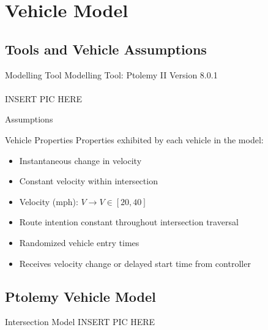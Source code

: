 \documentclass{beamer}
\begin{document}
\section{Vehicle Model}

\subsection{Tools and Vehicle Assumptions}

\begin{frame}{Modelling Tool}
Modelling Tool: Ptolemy II Version 8.0.1\\\\

INSERT PIC HERE

\end{frame}

\begin{frame}{Assumptions}
\begin{block}{Vehicle Properties}
Properties exhibited by each vehicle in the model:
\begin{itemize}
\item Instantaneous change in velocity
\item Constant velocity within intersection
\item Velocity (mph): $V \rightarrow V \in [20,40]$
\item Route intention constant throughout intersection traversal
\item Randomized vehicle entry times
\item Receives velocity change or delayed start time from controller
\end{itemize}
\end{block}
\end{frame}

\subsection{Ptolemy Vehicle Model}

\begin{frame}{Intersection Model}
INSERT PIC HERE
\end{frame}
\end{document}
